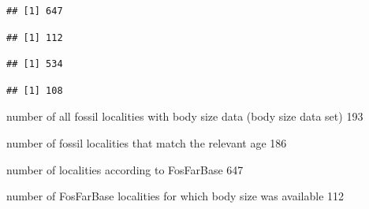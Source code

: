 \documentclass[]{article}
\newenvironment{Shaded}{\begin{snugshade}}{\end{snugshade}}
\newcommand{\KeywordTok}[1]{\textcolor[rgb]{0.13,0.29,0.53}{\textbf{{#1}}}}
\newcommand{\DataTypeTok}[1]{\textcolor[rgb]{0.13,0.29,0.53}{{#1}}}
\newcommand{\DecValTok}[1]{\textcolor[rgb]{0.00,0.00,0.81}{{#1}}}
\newcommand{\FloatTok}[1]{\textcolor[rgb]{0.00,0.00,0.81}{{#1}}}
\newcommand{\StringTok}[1]{\textcolor[rgb]{0.31,0.60,0.02}{{#1}}}
\newcommand{\NormalTok}[1]{{#1}}
\begin{document}
\begin{verbatim}
## [1] 647
\end{verbatim}

\begin{Shaded}
\end{Shaded}

\begin{verbatim}
## [1] 112
\end{verbatim}

\begin{Shaded}
\end{Shaded}

\begin{verbatim}
## [1] 534
\end{verbatim}

\begin{Shaded}
\end{Shaded}

\begin{verbatim}
## [1] 108
\end{verbatim}

number of all fossil localities with body size data (body size data set)
193

number of fossil localities that match the relevant age 186

number of localities according to FosFarBase 647

number of FosFarBase localities for which body size was available 112
\end{document}
